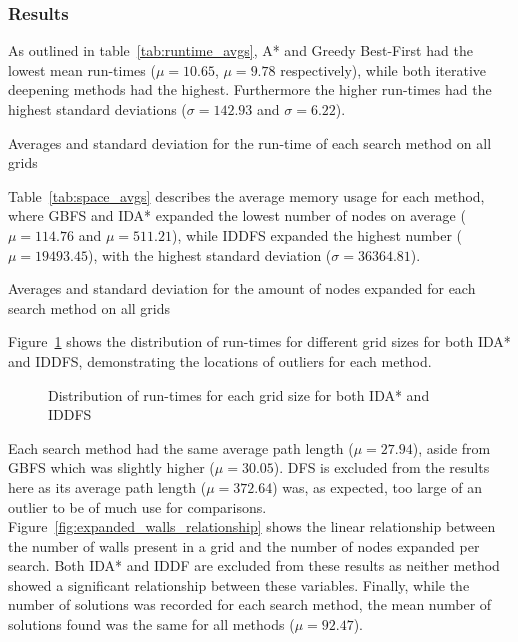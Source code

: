 \subsubsection{Results} %
\label{sub:results}
As outlined in table~\ref{tab:runtime_avgs}, A* and Greedy Best-First had the lowest mean run-times ($\mu=10.65$, $\mu=9.78$ respectively), while both iterative deepening methods had the highest. Furthermore the higher run-times had the highest standard deviations ($\sigma=142.93$ and $\sigma=6.22$).

\begin{table}[H]
	\centering
	
	\caption{Averages and standard deviation for the run-time of each search method on all grids}
	\label{tab:runtime_avgs}
\end{table}

Table~\ref{tab:space_avgs} describes the average memory usage for each method, where GBFS and IDA* expanded the lowest number of nodes on average ($\mu=114.76$ and $\mu=511.21$), while IDDFS expanded the highest number ($\mu=19493.45$), with the highest standard deviation ($\sigma=36364.81$).

\begin{table}[H]
	\centering
	
	\caption{Averages and standard deviation for the amount of nodes expanded for each search method on all grids}
	\label{tab:space_avgs}
\end{table}

Figure~\ref{fig:idas_iddfs_runtime_dist} shows the distribution of run-times for different grid sizes for both IDA* and IDDFS, demonstrating the locations of outliers for each method.

\begin{figure}[H]
	\hfill
	\hfill
	\caption{Distribution of run-times for each grid size for both IDA* and IDDFS}
	\label{fig:idas_iddfs_runtime_dist}
\end{figure}

Each search method had the same average path length ($\mu=27.94$), aside from GBFS which was slightly higher ($\mu=30.05$). DFS is excluded from the results here as its average path length ($\mu=372.64$) was, as expected, too large of an outlier to be of much use for comparisons. Figure~\ref{fig:expanded_walls_relationship} shows the linear relationship between the number of walls present in a grid and the number of nodes expanded per search. Both IDA* and IDDF are excluded from these results as neither method showed a significant relationship between these variables. Finally, while the number of solutions was recorded for each search method, the mean number of solutions found was the same for all methods ($\mu=92.47$).

